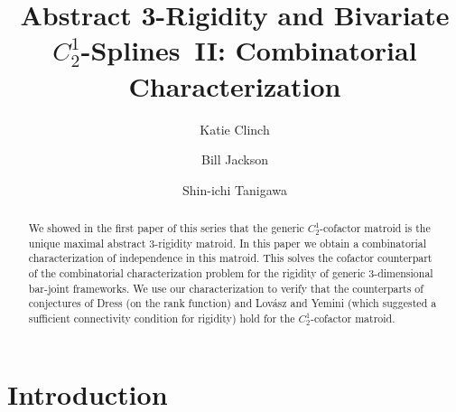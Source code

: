 \documentclass{daj}
\begin{document}
\begin{frontmatter}[classification=text]

\title{Abstract 3-Rigidity and Bivariate $C_2^1$-Splines~II: Combinatorial
Characterization} %

\author[katie]{Katie Clinch
}
\author[bill]{Bill Jackson
}
\author[shin]{Shin-ichi Tanigawa
}


\begin{abstract}
We showed in the first paper of this series that the generic $C_2^1$-cofactor matroid is the unique maximal abstract $3$-rigidity matroid. In this paper we obtain a combinatorial characterization of independence in this matroid.
This solves the cofactor counterpart of the combinatorial characterization problem for the rigidity of generic 3-dimensional bar-joint frameworks.
We use our characterization to verify that the counterparts of conjectures of Dress
(on the rank function) and  Lov{\'a}sz and Yemini (which suggested a  sufficient connectivity condition for rigidity) hold for the $C_2^1$-cofactor matroid. 

\end{abstract}
\end{frontmatter}

\section{Introduction}
\end{document}
